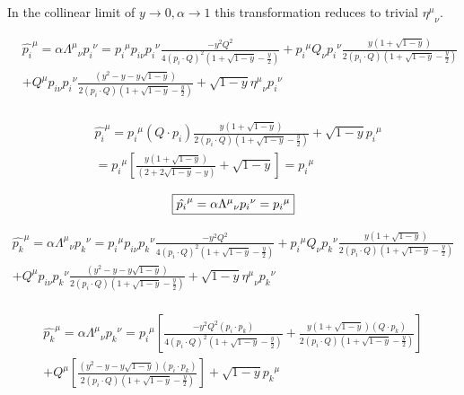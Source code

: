 In the collinear limit of $ y \rightarrow 0, \alpha \rightarrow 1 $
this transformation reduces to trivial $ {\eta^{\mu}}_{\nu} $.


\begin{equation}
\begin{split}
&{\hat{{p_i}}}^{\mu}=\alpha{\Lambda^{\mu}}_{\nu} {p_i}^{\nu}= {p_i}^{\mu} p_{i\nu}{p_i}^{\nu} \frac{-y^2 Q^2}{4(p_i\cdot Q)^2(1+\sqrt{1-y}-\frac{y}{2})}
	+{p_i}^{\mu} Q_{\nu}{p_i}^{\nu} \frac{y(1+\sqrt{1-y})}{2(p_i\cdot Q)(1+\sqrt{1-y}-\frac{y}{2})}\\
&+{Q}^{\mu} p_{i\nu}{p_i}^{\nu} \frac{(y^2 -y-y\sqrt{1-y})}{2(p_i\cdot Q)(1+\sqrt{1-y}-\frac{y}{2})}+\sqrt{1-y} {\eta^{\mu}}_{\nu}{p_i}^{\nu}\\
\end{split}
\end{equation}

\begin{equation}
\begin{split}
&{\hat{{p_i}}}^{\mu}={p_i}^{\mu} (Q\cdot p_i) \frac{y(1+\sqrt{1-y})}{2(p_i\cdot Q)(1+\sqrt{1-y}-\frac{y}{2})}+\sqrt{1-y} {p_i}^{\mu}\\
&={p_i}^{\mu} [ \frac{y(1+\sqrt{1-y})}{(2+2\sqrt{1-y}-y)}+\sqrt{1-y}]={p_i}^{\mu}
    \end{split}
\end{equation}

\begin{equation}
	\begin{aligned}
		\fbox{$  {\hat{{p_i}}}^{\mu}=\alpha{\Lambda^{\mu}}_{\nu} {p_i}^{\nu}= {p_i}^{\mu}$}
    \end{aligned}
\end{equation}

\begin{equation}
	\begin{aligned}
	{\hat{{p_k}}}^{\mu}=\alpha{\Lambda^{\mu}}_{\nu} {p_k}^{\nu}= {p_i}^{\mu} p_{i\nu}{p_k}^{\nu} \frac{-y^2 Q^2}{4(p_i\cdot Q)^2(1+\sqrt{1-y}-\frac{y}{2})}
	+{p_i}^{\mu} Q_{\nu}{p_k}^{\nu} \frac{y(1+\sqrt{1-y})}{2(p_i\cdot Q)(1+\sqrt{1-y}-\frac{y}{2})}\\
	+{Q}^{\mu} p_{i\nu}{p_k}^{\nu} \frac{(y^2 -y-y\sqrt{1-y})}{2(p_i\cdot Q)(1+\sqrt{1-y}-\frac{y}{2})}+\sqrt{1-y} {\eta^{\mu}}_{\nu}{p_k}^{\nu}\\
    \end{aligned}
\end{equation}

\begin{equation}
	\begin{aligned}
	{\hat{{p_k}}}^{\mu}=\alpha{\Lambda^{\mu}}_{\nu} {p_k}^{\nu}= {p_i}^{\mu}[  \frac{-y^2 Q^2 (p_{i}\cdot {p_k})}{4(p_i\cdot Q)^2(1+\sqrt{1-y}-\frac{y}{2})}+ \frac{y(1+\sqrt{1-y})(Q \cdot {p_k})}{2(p_i\cdot Q)(1+\sqrt{1-y}-\frac{y}{2})}]\\
	+{Q}^{\mu} [ \frac{(y^2 -y-y\sqrt{1-y}) (p_{i}\cdot {p_k})}{2(p_i\cdot Q)(1+\sqrt{1-y}-\frac{y}{2})}]
	+\sqrt{1-y} {p_k}^{\mu}\\
    \end{aligned}
\end{equation}


